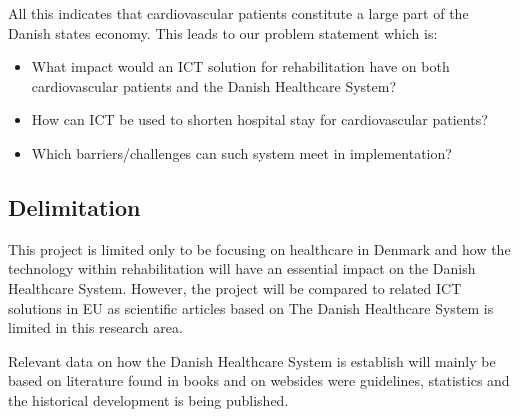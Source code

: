 All this indicates that cardiovascular patients constitute a large part of the Danish states economy. This leads to our problem statement which is:

\begin{itemize}
	\item What impact would an ICT solution for rehabilitation have on both cardiovascular patients and the Danish Healthcare System?
	\item How can ICT be used to shorten hospital stay for cardiovascular patients?
	\item Which barriers/challenges can such system meet in implementation?
\end{itemize}

\subsection{Delimitation}
This project is limited only to be focusing on healthcare in Denmark and how the technology within rehabilitation will have an essential impact on the Danish Healthcare System. However, the project will be compared to related ICT solutions in EU as scientific articles based on The Danish Healthcare System is limited in this research area. 

Relevant data on how the Danish Healthcare System is establish will mainly be based on literature found in books and on websides were guidelines, statistics and the historical development is being published. 


